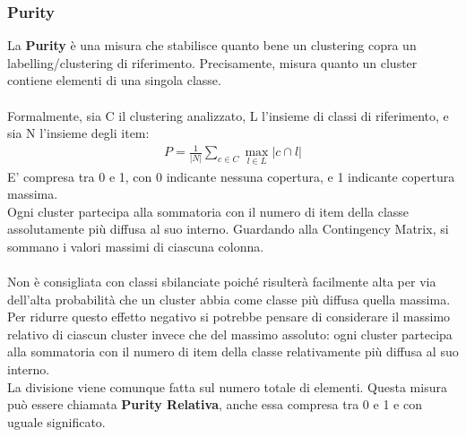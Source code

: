\subsubsection{Purity}
La \textbf{Purity} è una misura che stabilisce quanto bene un clustering copra un labelling/clustering di riferimento. Precisamente, misura quanto un cluster contiene elementi di una singola classe.\\
\\
Formalmente, sia C il clustering analizzato, L l'insieme di classi di riferimento, e sia N l'insieme degli item:
\begin{align}
	P = \frac{1}{|N|}\sum_{c \in C}\max_{l \in L}|c \cap l|
\end{align}
E' compresa tra 0 e 1, con 0 indicante nessuna copertura, e 1 indicante copertura massima.\\
Ogni cluster partecipa alla sommatoria con il numero di item della classe assolutamente più diffusa al suo interno. Guardando alla Contingency Matrix, si sommano i valori massimi di ciascuna colonna.\\
\\
Non è consigliata con classi sbilanciate poiché risulterà facilmente alta per via dell'alta probabilità che un cluster abbia come classe più diffusa quella massima.\\
Per ridurre questo effetto negativo si potrebbe pensare di considerare il massimo relativo di ciascun cluster invece che del massimo assoluto: ogni cluster partecipa alla sommatoria con il numero di item della classe relativamente più diffusa al suo interno.\\
La divisione viene comunque fatta sul numero totale di elementi. Questa misura può essere chiamata \textbf{Purity Relativa}, anche essa compresa tra 0 e 1 e con uguale significato.


